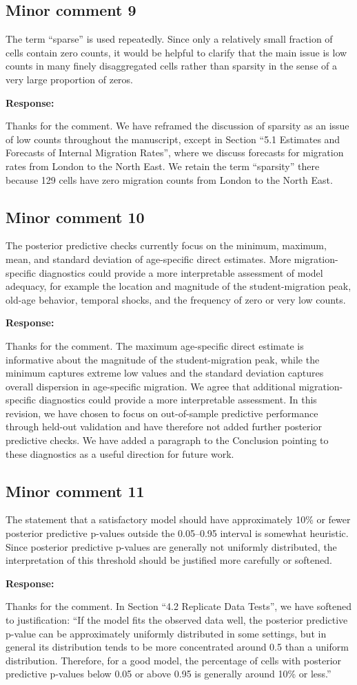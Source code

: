 \documentclass[11pt,a4paper]{article}
\newlength{\replyspace}
\newenvironment{response}{\par\addvspace{\replyspace}\nopagebreak\textbf{\textcolor{replyblue}{Response:}}\par\begingroup\color{replyblue}}{\par\endgroup\vspace{\replyspace}}
\newcommand{\refcomment}[2]{\par\Needspace{5\baselineskip}\subsection*{#1}#2\par}
\begin{document}
\refcomment{Minor comment 9}{
The term ``sparse'' is used repeatedly. Since only a relatively small fraction of cells contain zero counts, it would be helpful to clarify that the main issue is low counts in many finely disaggregated cells rather than sparsity in the sense of a very large proportion of zeros.
}
\begin{response}
Thanks for the comment. We have reframed the discussion of sparsity as an issue of low counts throughout the manuscript, except in Section ``5.1 Estimates and Forecasts of Internal Migration Rates'', where we discuss forecasts for migration rates from London to the North East. We retain the term ``sparsity'' there because 129 cells have zero migration counts from London to the North East.
\end{response}

\refcomment{Minor comment 10}{
The posterior predictive checks currently focus on the minimum, maximum, mean, and standard deviation of age-specific direct estimates. More migration-specific diagnostics could provide a more interpretable assessment of model adequacy, for example the location and magnitude of the student-migration peak, old-age behavior, temporal shocks, and the frequency of zero or very low counts.
}
\begin{response}
Thanks for the comment. {\color{magenta} The maximum age-specific direct estimate is informative about the magnitude
of the student-migration peak, while the minimum captures extreme low values and the standard deviation
captures overall dispersion in age-specific migration. We agree that additional migration-specific diagnostics could provide a more interpretable assessment. In this revision, we have chosen to focus on out-of-sample predictive performance through held-out validation and have therefore not added further posterior predictive checks. We have added a paragraph to the Conclusion pointing to these diagnostics as a useful direction for future work.}
\end{response}

\refcomment{Minor comment 11}{
The statement that a satisfactory model should have approximately 10\% or fewer posterior predictive p-values outside the 0.05--0.95 interval is somewhat heuristic. Since posterior predictive p-values are generally not uniformly distributed, the interpretation of this threshold should be justified more carefully or softened.
}
\begin{response}
Thanks for the comment. In Section ``4.2 Replicate Data Tests'', we have softened to justification: ``If the model fits the observed data well, the posterior predictive p-value can be approximately uniformly distributed in some settings, but in general its distribution tends to be more concentrated around 0.5 than a uniform distribution. Therefore, for a good model, the percentage of cells with posterior predictive p-values below 0.05 or above 0.95 is generally around 10\% or less.''
\end{response}
\end{document}
